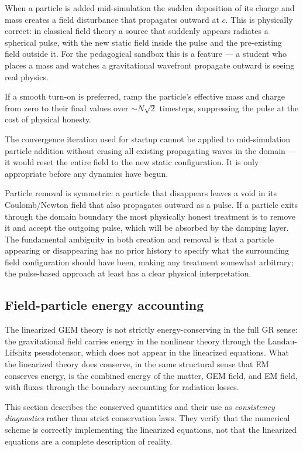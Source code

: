 \documentclass[11pt,a4paper]{article}
\begin{document}
When a particle is added mid-simulation the sudden deposition of its charge and mass creates a field disturbance that propagates outward at $c$.  This is physically correct: in classical field theory a source that suddenly appears radiates a spherical pulse, with the new static field inside the pulse and the pre-existing field outside it.  For the pedagogical sandbox this is a feature --- a student who places a mass and watches a gravitational wavefront propagate outward is seeing real physics.

If a smooth turn-on is preferred, ramp the particle's effective mass and charge from zero to their final values over $\sim N\sqrt{2}$ timesteps, suppressing the pulse at the cost of physical honesty.

The convergence iteration used for startup cannot be applied to mid-simulation particle addition without erasing all existing propagating waves in the domain --- it would reset the entire field to the new static configuration.  It is only appropriate before any dynamics have begun.

Particle removal is symmetric: a particle that disappears leaves a void in its Coulomb/Newton field that also propagates outward as a pulse.  If a particle exits through the domain boundary the most physically honest treatment is to remove it and accept the outgoing pulse, which will be absorbed by the damping layer.  The fundamental ambiguity in both creation and removal is that a particle appearing or disappearing has no prior history to specify what the surrounding field configuration should have been, making any treatment somewhat arbitrary; the pulse-based approach at least has a clear physical interpretation.

\subsection{Field-particle energy accounting}
\label{sec:energy}

The linearized GEM theory is not strictly energy-conserving in the full GR sense: the gravitational field carries energy in the nonlinear theory through the Landau-Lifshitz pseudotensor, which does not appear in the linearized equations.  What the linearized theory does conserve, in the same structural sense that EM conserves energy, is the combined energy of the matter, GEM field, and EM field, with fluxes through the boundary accounting for radiation losses.

This section describes the conserved quantities and their use as \emph{consistency diagnostics} rather than strict conservation laws.  They verify that the numerical scheme is correctly implementing the linearized equations, not that the linearized equations are a complete description of reality.
\end{document}

